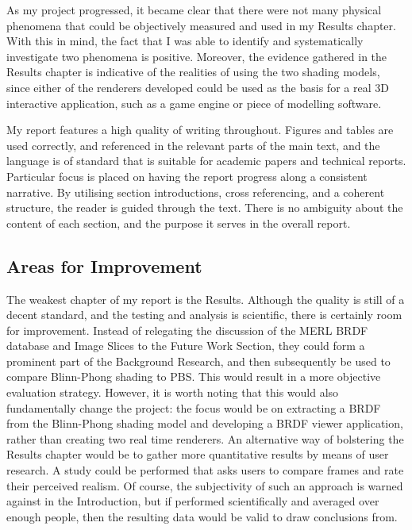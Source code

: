\begin{appendices}
As my project progressed, it became clear that there were not many physical phenomena that could be objectively measured and used in my Results chapter. With this in mind, the fact that I was able to identify and systematically investigate two phenomena is positive. Moreover, the evidence gathered in the Results chapter is indicative of the realities of using the two shading models, since either of the renderers developed could be used as the basis for a real 3D interactive application, such as a game engine or piece of modelling software.

My report features a high quality of writing throughout. Figures and tables are used correctly, and referenced in the relevant parts of the main text, and the language is of standard that is suitable for academic papers and technical reports. Particular focus is placed on having the report progress along a consistent narrative. By utilising section introductions, cross referencing, and a coherent structure, the reader is guided through the text. There is no ambiguity about the content of each section, and the purpose it serves in the overall report.

\subsection{Areas for Improvement}

The weakest chapter of my report is the Results. Although the quality is still of a decent standard, and the testing and analysis is scientific, there is certainly room for improvement. Instead of relegating the discussion of the MERL BRDF database and Image Slices to the Future Work Section, they could form a prominent part of the Background Research, and then subsequently be used to compare Blinn-Phong shading to PBS. This would result in a more objective evaluation strategy. However, it is worth noting that this would also fundamentally change the project: the focus would be on extracting a BRDF from the Blinn-Phong shading model and developing a BRDF viewer application, rather than creating two real time renderers. An alternative way of bolstering the Results chapter would be to gather more quantitative results by means of user research. A study could be performed that asks users to compare frames and rate their perceived realism. Of course, the subjectivity of such an approach is warned against in the Introduction, but if performed scientifically and averaged over enough people, then the resulting data would be valid to draw conclusions from.


\end{appendices}

